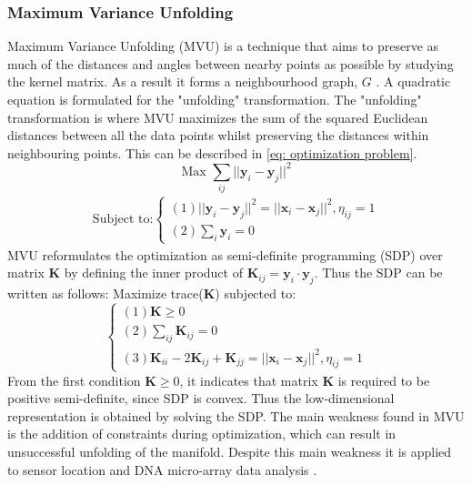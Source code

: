 \documentclass[11pt,twocolumn]{witseiepaper}
\begin{document}
	\subsubsection{Maximum Variance Unfolding}
	Maximum Variance Unfolding (MVU) is a technique that aims to preserve as much of the distances and angles between nearby points as possible by studying the kernel matrix. As a result it forms a neighbourhood graph, $G$ \cite{Jiang2011}. A quadratic equation is formulated for the "unfolding" transformation. The "unfolding" transformation is where MVU maximizes the sum of the squared Euclidean distances between all the data points whilst preserving the distances within neighbouring points. This can be described in \eqref{eq: optimization problem}.
	\begin{equation}
		\text{Max } \sum_{ij}||\textbf{y}_i - \textbf{y}_j||^{2}
		\label{eq: optimization problem}
	\end{equation}
	\begin{align*}
		\text{Subject to:}
		\begin{cases}
			(1)||\textbf{y}_i - \textbf{y}_j||^{2} = ||\textbf{x}_i - \textbf{x}_j||^{2} , \eta_{ij} = 1 \\
			(2)\sum_{i}\textbf{y}_i = 0
		\end{cases}
	\end{align*}
	MVU reformulates the optimization as semi-definite programming (SDP) over matrix $\textbf{K}$ by defining the inner product of $\textbf{K}_{ij} = \textbf{y}_i \cdot \textbf{y}_j$. Thus the SDP can be written as follows: 
	\newline
	Maximize trace(\textbf{K}) subjected to:
	\begin{equation}
		\begin{cases}
			(1) \textbf{K} \geq 0 \\
			(2) \sum_{ij} \textbf{K}_{ij} = 0 \\
			(3) \textbf{K}_{ii} - 2\textbf{K}_{ij} + \textbf{K}_{jj} = ||\textbf{x}_i - \textbf{x}_j||^{2}, \eta_{ij} = 1
		\end{cases}
	\end{equation} 
	From the first condition $\textbf{K} \geq 0$, it indicates that matrix $\textbf{K}$ is required to be positive semi-definite, since SDP is convex. Thus the low-dimensional representation is obtained by solving the SDP. The main weakness found in MVU is the addition of constraints during optimization, which can result in unsuccessful unfolding of the manifold. Despite this main weakness it is applied to sensor location and DNA micro-array data analysis \cite{van2009dimensionality}.
	
\end{document}
